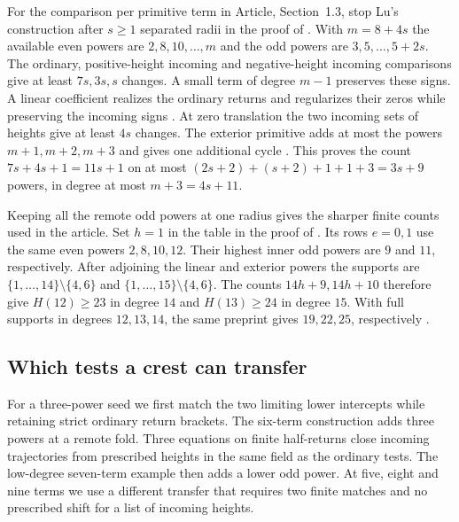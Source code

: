 For the comparison per primitive term in Article, Section~1.3, stop
Lu's construction after $s\ge1$ separated radii in the proof of
\cite[Lemma~5.3]{LuDegree}. With $m=8+4s$ the available even powers
are $2,8,10,\ldots,m$ and the odd powers are $3,5,\ldots,5+2s$.
The ordinary, positive-height incoming and negative-height incoming
comparisons give at least $7s,3s,s$ changes. A small term of degree
$m-1$ preserves these signs. A linear coefficient realizes the
ordinary returns and regularizes their zeros while preserving the
incoming signs \cite[Lemma~3.2(ii) and Propositions~3.1, 2.4(i)]{LuDegree}.
At zero translation the two incoming sets of heights give at least
$4s$ changes. The exterior primitive adds at most the powers
$m+1,m+2,m+3$ and gives one additional cycle
\cite[Proposition~3.3, (3.9) and (3.11)]{LuDegree}. This proves the
count $7s+4s+1=11s+1$ on at most $(2s+2)+(s+2)+1+1+3=3s+9$
powers, in degree at most $m+3=4s+11$.

Keeping all the remote odd powers at one radius gives the sharper
finite counts used in the article. Set $h=1$ in the table in the
proof of \cite[Proposition~5.1]{LuDegree}. Its rows $e=0,1$ use
the same even powers $2,8,10,12$. Their highest inner odd powers
are $9$ and $11$, respectively. After adjoining the linear and
exterior powers the supports are
$\{1,\ldots,14\}\setminus\{4,6\}$ and
$\{1,\ldots,15\}\setminus\{4,6\}$. The counts $14h+9,14h+10$
therefore give $H(12)\ge23$ in degree $14$ and $H(13)\ge24$ in
degree $15$. With full supports in degrees $12,13,14$, the same
preprint gives $19,22,25$, respectively \cite[supplement, Theorem~S1.1
and Proposition~S1.2, and article, Theorem~1.1]{LuDegree}.

\subsection{Which tests a crest can transfer}
For a three-power seed we first match the two limiting lower intercepts
while retaining strict ordinary return brackets. The six-term construction
adds three powers at a remote fold. Three equations on finite half-returns
close incoming trajectories from prescribed heights in the same field
as the ordinary tests. The low-degree seven-term example then adds a
lower odd power. At five, eight and nine terms we use a different
transfer that requires two finite matches and no prescribed shift for
a list of incoming heights.

